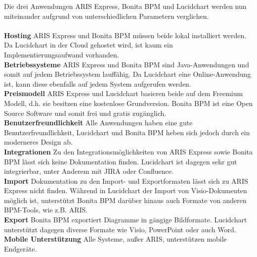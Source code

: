 Die drei Anwendungen ARIS Express, Bonita BPM und Lucidchart werden nun
miteinander aufgrund von unterschiedlichen Parametern verglichen.
\\
\\
\textbf{Hosting} ARIS Express und Bonita BPM müssen beide lokal installiert
werden. Da Lucidchart in der Cloud gehostet wird, ist kaum ein Implementierungsaufwand vorhanden.
\\
\textbf{Betriebssysteme} ARIS Express und Bonita BPM sind Java-Anwendungen und
somit auf jedem Betriebssystem lauffähig. Da Lucidchart eine Online-Anwendung
ist, kann diese ebenfalls auf jedem System aufgerufen werden. 
\\
\textbf{Preismodell} ARIS Express und Lucidchart basieren beide auf dem Freemium
Modell, d.h. sie besitzen eine kostenlose Grundversion. Bonita BPM ist eine Open
Source Software und somit frei und gratis zugänglich.
\\
\textbf{Benutzerfreundlichkeit} Alle Anwendungen haben eine gute
Benutzerfreundlichkeit, Lucidchart und Bonita BPM heben sich jedoch durch ein
moderneres Design ab.
\\
\textbf{Integrationen} Zu den Integrationsmöglichkeiten von ARIS Express sowie
Bonita BPM lässt sich keine Dokumentation finden. Lucidchart ist dagegen sehr
gut integrierbar, unter Anderem mit JIRA oder Confluence.
\\
\textbf{Import} Dokumentation zu den Import- und Exportformaten lässt sich zu
ARIS Express nicht finden. Während in Lucidchart der Import von Visio-Dokumenten möglich ist,
unterstützt Bonita BPM darüber hinaus auch Formate von anderen BPM-Tools, wie
z.B. ARIS.
\\
\textbf{Export} Bonita BPM exportiert Diagramme in gängige Bildformate.
Lucidchart unterstützt dagegen diverse Formate wie Visio, PowerPoint oder auch
Word. 
\\
\textbf{Mobile Unterstützung} Alle Systeme, außer ARIS, unterstützen mobile
Endgeräte.
\\
\\

